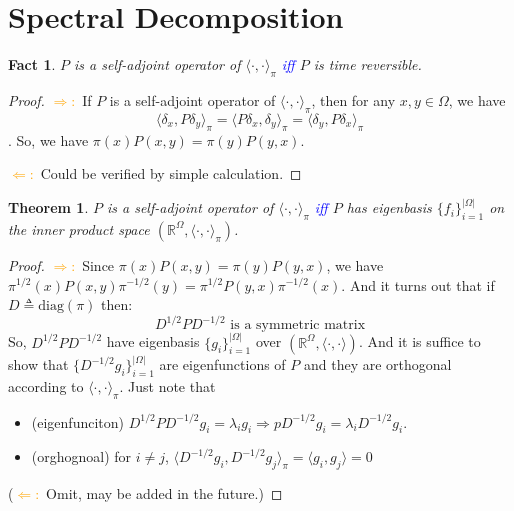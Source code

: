 \documentclass[utf8]{article}
\newtheorem{theorem}{Theorem}[section]
\newtheorem{fact}{Fact}[section]
\def\<{\langle}
\def\>{\rangle}
\begin{document}
\section{Spectral Decomposition}
\begin{fact}
  $P$ is a self-adjoint operator of $\<\cdot, \cdot\>_\pi$ \textcolor{blue}{iff} $P$ is time reversible.
\end{fact}
\begin{proof}
  \textcolor{orange}{$\Rightarrow:$} If $P$ is a self-adjoint operator of $\<\cdot, \cdot\>_\pi$, then for any $x, y\in\Omega$, we have \[\<\delta_x, P\delta_y\>_\pi = \<P\delta_x, \delta_y\>_\pi = \<\delta_y, P\delta_x\>_\pi\].
  So, we have $\pi(x)P(x,y) = \pi(y)P(y, x)$.
  
  \textcolor{orange}{$\Leftarrow:$} Could be verified by simple calculation.
\end{proof}
\begin{theorem}
  $P$ is a self-adjoint operator of $\<\cdot, \cdot\>_\pi$ \textcolor{blue}{iff} $P$ has eigenbasis $\{f_i\}_{i=1}^{|\Omega|}$ on the inner product space $(\mathbb{R}^\Omega, \<\cdot, \cdot\>_\pi)$.
\end{theorem}
\begin{proof}
  \textcolor{orange}{$\Rightarrow:$} Since $\pi(x)P(x,y) = \pi(y)P(y,x)$, we have $\pi^{1/2}(x)P(x,y)\pi^{-1/2}(y) = \pi^{1/2}P(y,x)\pi^{-1/2}(x)$. And it turns out that if $D\triangleq \mathrm{diag}(\pi)$ then:
  \[D^{1/2} P D^{-1/2} \mbox{ is a symmetric matrix}\]
  So, $D^{1/2} P D^{-1/2}$ have eigenbasis $\{g_i\}_{i=1}^{|\Omega|}$ over $(\mathbb{R}^\Omega, \<\cdot, \cdot\>)$.
  And it is suffice to show that $\{D^{-1/2}g_i\}_{i=1}^{|\Omega|}$ are eigenfunctions of $P$ and they are orthogonal according to $\<\cdot, \cdot\>_\pi$. Just note that
  \begin{itemize}
  \item (eigenfunciton) $D^{1/2} P D^{-1/2} g_i = \lambda_i g_i \Rightarrow p D^{-1/2} g_i = \lambda_i D^{-1/2} g_i$.
  \item (orghognoal) for $i\not= j$, $\<D^{-1/2}g_i, D^{-1/2}g_j\>_\pi = \<g_i, g_j\> = 0$
  \end{itemize}
  (\textcolor{orange}{$\Leftarrow:$} Omit, may be added in the future.)
\end{proof}
\end{document}
